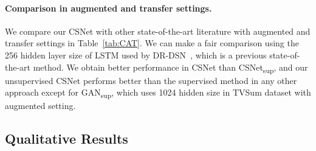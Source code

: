 \documentclass[letterpaper]{article} \usepackage{aaai19}  \usepackage{times}  \usepackage{helvet}  \usepackage{courier}  \usepackage{url}  \usepackage{graphicx}  \frenchspacing  \setlength{\pdfpagewidth}{8.5in}  \setlength{\pdfpageheight}{11in}
\newcommand{\tabref}[1]{Table~\ref{#1}}
\begin{document}
\begin{table}
\centering
{}
\caption{F-score (\%) of both unsupervised and supervised methods in canonical, augmented and transfer settings on SumMe and TVSum datasets.}
\label{tab:CAT}
\end{table}


\paragraph{Comparison in augmented and transfer settings.}
We compare our CSNet with other state-of-the-art literature with augmented and transfer settings in \tabref{tab:CAT}. We can make a fair comparison using the 256 hidden layer size of LSTM used by DR-DSN~\cite{zhou2017deep}, which is a previous state-of-the-art method. We obtain better performance in CSNet than CSNet\textsubscript{sup}, and our unsupervised CSNet performs better than the supervised method in any other approach except for GAN\textsubscript{sup}, which uses 1024 hidden size in TVSum dataset with augmented setting.


\subsection{Qualitative Results}
\end{document}
